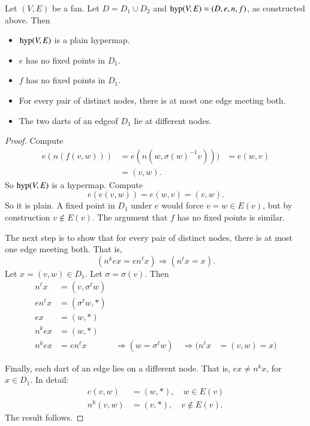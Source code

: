 \begin{lemma}
Let $(V,E)$ be a fan.  Let $D = D_1\cup D_2$
and ${\operatorname{hyp}}(V,E) = (D,e,n,f)$, as constructed above.  Then
    \begin{itemize}
    \item ${\operatorname{hyp}}(V,E)$ is a plain hypermap.
    \item  $e$ has no fixed
points in $D_1$.
    \item  $f$ has no fixed points in $D_1$.
    \item For every pair of distinct nodes, there is at most one
    edge meeting both.
    \item The two darts of an edgeof $D_1$ lie at different nodes.
    \end{itemize}
\end{lemma}

\begin{proof}  Compute
    $$
\begin{array}{lll}
e(n(f(v,w))) &= e(n(w,\sigma(w)^{-1} v))) &=
        e(w,v)\\ 
&= (v,w).
\end{array}
$$
So ${\operatorname{hyp}}(V,E)$ is a hypermap. Compute
    $$e(e(v,w)) = e(w,v) = (v,w).$$
So it is plain. A fixed point in $D_1$ under $e$ would force $v = w\in E(v)$,
but by construction $v\not\in E(v)$.  The argument that $f$ has no
fixed points is similar.

The next step is to show that for every pair of distinct nodes, there is at most one edge
meeting both.
That is,
        $$(n^k e x = e n^\ell x)\Rightarrow (n^\ell x = x).$$
Let $x = (v,w)\in D_1$.  Let $\sigma=\sigma(v)$. Then
    $$
    \begin{array}{lllllll}
    n^\ell x &= (v,\sigma^\ell w)\\
    e n^\ell x &= (\sigma^\ell w,*)\\
    e x &= (w,*)\\
    n^k e x &= (w,*)\\
    n^k e x &= e n^\ell x &\ \Rightarrow (w = \sigma^\ell w) &\ \Rightarrow
    (n^\ell x &= (v,w) = x)
    \end{array}
    $$

Finally,  each dart of an edge lies on a different node.
That is, $e x \ne n^k x$, for $x\in D_1$.   In detail:
    $$
    \begin{array}{lll}
        e(v,w) &= (w,*),\quad w\in E(v)\\
        n^k(v,w) &= (v,*),\quad v\not\in E(v).
    \end{array}
    $$
The result follows.
\end{proof}

